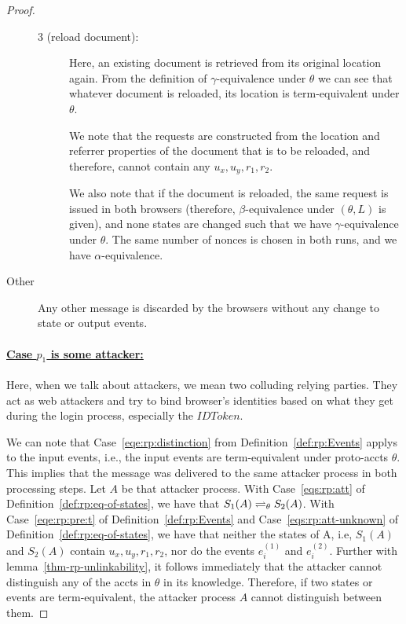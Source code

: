 \begin{theorem}
\begin{proof}
\begin{description}
\begin{description}
        \item[3 (reload document):]
          Here, an existing document is retrieved from its original location again. 
          From the definition of $\gamma$-equivalence under $\theta$ we can see that
          whatever document is reloaded, its location is term-equivalent under $\theta$.
      
          We note that the requests are constructed from
          the location and referrer properties of the document that is to
          be reloaded, and therefore, cannot contain any $u_x, u_y, r_1, r_2$.
      
          We also note that if the document is reloaded, the same 
          request is issued in both browsers (therefore,
          $\beta$-equivalence under $(\theta, L)$ is given), and 
          none states are changed such that we have
          $\gamma$-equivalence under $\theta$. The same number of
          nonces is chosen in both runs, and we have $\alpha$-equivalence.
        \end{description}
      \item[Other] Any other message is discarded by the browsers without any change to state or output events.
    \end{description}
  
    \paragraph{\underline{Case $p_1$ is some attacker:}}
    
    Here, when we talk about attackers, 
    we mean two colluding relying parties.
    They act as web attackers and try to bind browser's identities 
    based on what they get during the login process, 
    especially the $IDToken$.
    
    We can note that Case~\ref{eqe:rp:distinction} from Definition~\ref{def:rp:Events} applys to the input events,
    i.e., the input events are term-equivalent under proto-accts $\theta$. 
    This implies that the message was delivered to the 
    same attacker process in both processing steps. 
    Let $A$ be that attacker process. 
    With Case~\ref{eqs:rp:att} of Definition~\ref{def:rp:eq-of-states}, 
    we have that $S_1(A) \rightleftharpoons_{\theta} S_2(A)$. 
    With Case~\ref{eqe:rp:pre:t} of Definition~\ref{def:rp:Events} and Case~\ref{eqs:rp:att-unknown} of Definition~\ref{def:rp:eq-of-states}, 
    we have that neither the states of A, i.e, $S_1(A)$ and $S_2(A)$ contain $u_x, u_y, r_1, r_2$, 
    nor do the events $e_i^{(1)}$ and $e_i^{(2)}$.
    Further with lemma~\ref{thm-rp-unlinkability}, it follows immediately that the attacker cannot distinguish any of the accts in $\theta$ in its knowledge.
    Therefore, if two states or events are term-equivalent, the attacker process $A$ cannot distinguish between them.


\end{proof}
\end{theorem}
